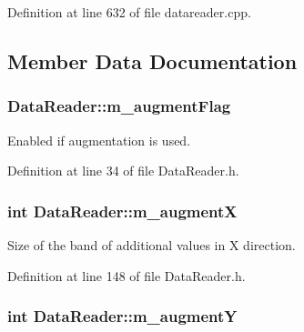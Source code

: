 Definition at line 632 of file datareader.\+cpp.



\subsection{Member Data Documentation}
\subsubsection[{\texorpdfstring{m\+\_\+augment\+Flag}{m_augmentFlag}}]{ Data\+Reader\+::m\+\_\+augment\+Flag\hspace{0.3cm}{\ttfamily [private]}}\hypertarget{classDataReader_a09cceda2cf4ac5522c6e05b1424660d4}{}\label{classDataReader_a09cceda2cf4ac5522c6e05b1424660d4}


Enabled if augmentation is used. 



Definition at line 34 of file Data\+Reader.\+h.

\subsubsection[{\texorpdfstring{m\+\_\+augmentX}{m_augmentX}}]{\setlength{\rightskip}{0pt plus 5cm}int Data\+Reader\+::m\+\_\+augmentX\hspace{0.3cm}{\ttfamily [private]}}\hypertarget{classDataReader_a3857860c363d6127fc8b6b54fd53d81f}{}\label{classDataReader_a3857860c363d6127fc8b6b54fd53d81f}


Size of the band of additional values in X direction. 



Definition at line 148 of file Data\+Reader.\+h.

\subsubsection[{\texorpdfstring{m\+\_\+augmentY}{m_augmentY}}]{\setlength{\rightskip}{0pt plus 5cm}int Data\+Reader\+::m\+\_\+augmentY\hspace{0.3cm}{\ttfamily [private]}}\hypertarget{classDataReader_a139941a6fc5ba0546a1ddb892b2ec958}{}\label{classDataReader_a139941a6fc5ba0546a1ddb892b2ec958}


